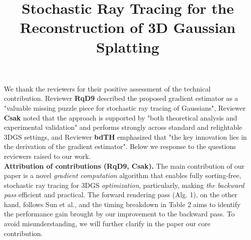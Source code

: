 \documentclass[10pt,twocolumn,letterpaper]{article}
\newcommand{\Rone}{\textcolor{rred}{\textbf{RqD9}}\xspace}
\newcommand{\Rtwo}{\textcolor{rblue}{\textbf{Csak}}\xspace}
\newcommand{\Rthree}{\textcolor{rgreen}{\textbf{bdTH}}\xspace}
\newcommand{\myparagraph}[1]{\noindent\textbf{#1}}
\begin{document}
\title{Stochastic Ray Tracing for the Reconstruction of 3D Gaussian Splatting}  %

\maketitle
\thispagestyle{empty}
\appendix

\noindent{}We thank the reviewers for their positive assessment of the technical contribution. Reviewer \Rone described the proposed gradient estimator as a "valuable missing puzzle piece for stochastic ray tracing of Gaussians", Reviewer \Rtwo noted that the approach is supported by "both theoretical analysis and experimental validation" and performs strongly across standard and relightable 3DGS settings, and Reviewer \Rthree emphasized that "the key innovation lies in the derivation of the gradient estimator". Below we response to the questions reviewers raised to our work.
\\

\myparagraph{Attribution of contributions (\Rone, \Rtwo).}
%
The main contribution of our paper is a novel \emph{gradient computation} algorithm that enables fully sorting-free, stochastic ray tracing for 3DGS \emph{optimization}, particularly, making \emph{the backward pass} efficient and practical. The forward rendering pass (Alg. 1), on the other hand, follows Sun et al., and the timing breakdown in Table 2 aims to identify the performance gain brought by our improvement to the backward pass. 
To avoid misunderstanding, we will further clarify in the paper our core contribution.
\end{document}
